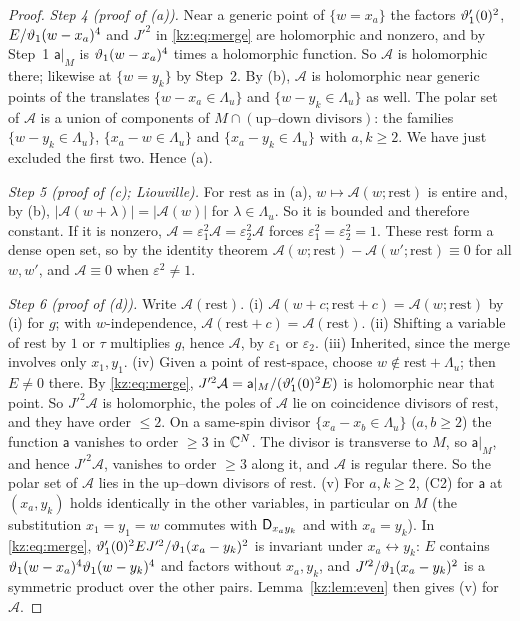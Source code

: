 \begin{proof}
\emph{Step 4 (proof of (a)).} Near a generic point of $\{w=x_a\}$ the factors $\vartheta_1'(0)^2$,
$E/\vartheta_1(w-x_a)^4$ and $J'^2$ in \eqref{kz:eq:merge} are holomorphic and nonzero, and by Step~1 $\mathsf a|_M$ is
$\vartheta_1(w-x_a)^4$ times a holomorphic function. So $\mathcal A$ is holomorphic there; likewise at $\{w=y_k\}$
by Step~2. By (b), $\mathcal A$ is holomorphic near generic points of the translates
$\{w-x_a\in\Lambda_u\}$ and $\{w-y_k\in\Lambda_u\}$ as well. The polar set of $\mathcal A$ is a union of components of
$M\cap(\text{up--down divisors})$: the families $\{w-y_k\in\Lambda_u\}$, $\{x_a-w\in\Lambda_u\}$ and
$\{x_a-y_k\in\Lambda_u\}$ with $a,k\ge2$. We have just excluded the first two. Hence (a).

\emph{Step 5 (proof of (c); Liouville).} For $\mathrm{rest}$ as in (a), $w\mapsto\mathcal A(w;\mathrm{rest})$ is entire
and, by (b), $|\mathcal A(w+\lambda)|=|\mathcal A(w)|$ for $\lambda\in\Lambda_u$. So it is bounded and therefore constant.
If it is nonzero, $\mathcal A=\varepsilon_1^2\mathcal A=\varepsilon_2^2\mathcal A$ forces $\varepsilon_1^2=\varepsilon_2^2=1$. These $\mathrm{rest}$ form a dense
open set, so by the identity theorem $\mathcal A(w;\mathrm{rest})-\mathcal A(w';\mathrm{rest})\equiv0$ for all $w,w'$, and
$\mathcal A\equiv0$ when $\varepsilon^2\neq1$.

\emph{Step 6 (proof of (d)).} Write $\mathcal A(\mathrm{rest})$.
(i) $\mathcal A(w+c;\mathrm{rest}+c)=\mathcal A(w;\mathrm{rest})$ by (i) for $g$; with $w$-independence,
$\mathcal A(\mathrm{rest}+c)=\mathcal A(\mathrm{rest})$.
(ii) Shifting a variable of $\mathrm{rest}$ by $1$ or $\tau$ multiplies $g$, hence $\mathcal A$, by $\varepsilon_1$ or $\varepsilon_2$.
(iii) Inherited, since the merge involves only $x_1,y_1$.
(iv) Given a point of $\mathrm{rest}$-space, choose $w\notin\mathrm{rest}+\Lambda_u$; then $E\ne0$ there. By
\eqref{kz:eq:merge}, $J'^2\mathcal A=\mathsf a|_M/(\vartheta_1'(0)^2E)$ is holomorphic near that point. So $J'^2\mathcal A$ is
holomorphic, the poles of $\mathcal A$ lie on coincidence divisors of $\mathrm{rest}$, and they have order $\le2$. On a
same-spin divisor $\{x_a-x_b\in\Lambda_u\}$ ($a,b\ge2$) the function $\mathsf a$ vanishes to order $\ge3$ in $\mathbb{C}^N$. The
divisor is transverse to $M$, so $\mathsf a|_M$, and hence $J'^2\mathcal A$, vanishes to order $\ge3$ along it, and
$\mathcal A$ is regular there. So the polar set of $\mathcal A$ lies in the up--down divisors of $\mathrm{rest}$.
(v) For $a,k\ge2$, (C2) for $\mathsf a$ at $(x_a,y_k)$ holds identically in the other variables, in particular on
$M$ (the substitution $x_1=y_1=w$ commutes with $\mathsf{D}_{x_ay_k}$ and with $x_a=y_k$). In \eqref{kz:eq:merge},
$\vartheta_1'(0)^2EJ'^2/\vartheta_1(x_a-y_k)^2$ is invariant under $x_a\leftrightarrow y_k$: $E$ contains
$\vartheta_1(w-x_a)^4\vartheta_1(w-y_k)^4$ and factors without $x_a,y_k$, and $J'^2/\vartheta_1(x_a-y_k)^2$ is a symmetric product
over the other pairs. Lemma~\ref{kz:lem:even} then gives (v) for $\mathcal A$.


\end{proof}
